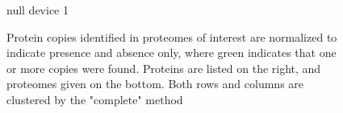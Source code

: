 
\begin{figure}
\begin{center}
\begin{Schunk}
\begin{Soutput}
null device 
          1 
\end{Soutput}
\end{Schunk}
\end{center}
\caption[Heatmap cluster analysis of flagellar proteins from \textit{Naegleria gruberi}]{Protein copies identified in proteomes of interest are normalized to indicate presence and absence only, where green indicates that one or more copies were found. Proteins are listed on the right, and proteomes given on the bottom. Both rows and columns are clustered by the "complete" method}
\label{fig:AppFlag_heatmap}
\end{figure}
